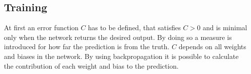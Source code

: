 \subsection{Training}
At first an error function $C$ has to be defined, that satisfies $C>0$ and is minimal only when the network returns the desired output. By doing so a measure is introduced for how far the prediction is from the truth. $C$ depends on all weights and biases in the network. By using backpropagation it is possible to calculate the contribution of each weight and bias to the prediction. 

